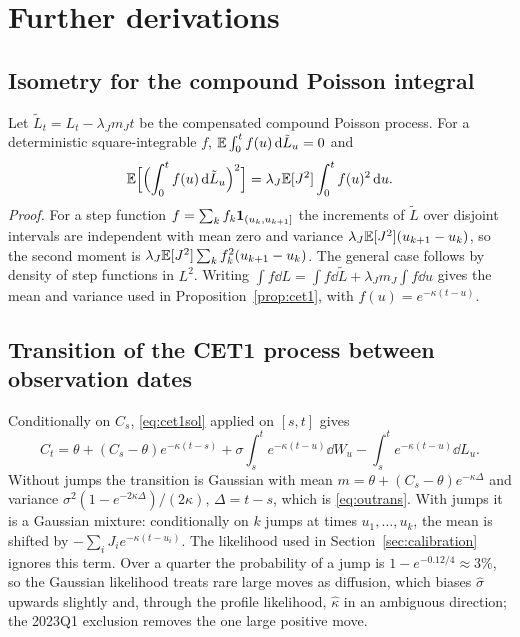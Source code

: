 \section{Further derivations}\label{app:derivations}

\subsection{Isometry for the compound Poisson integral}

Let $\tilde L_t=L_t-\lambda_Jm_Jt$ be the compensated compound Poisson process. For a
deterministic square-integrable $f$, $\mathbb{E}\int_0^tf(u)\,\mathrm{d}\tilde L_u=0$ and
\[
  \mathbb{E}\Bigl[\Bigl(\int_0^tf(u)\,\mathrm{d}\tilde L_u\Bigr)^2\Bigr]=\lambda_J\mathbb{E}[J^2]\int_0^tf(u)^2\,\mathrm{d} u .
\]
\emph{Proof.} For a step function $f=\sum_kf_k\mathbf{1}_{(u_k,u_{k+1}]}$ the increments of $\tilde L$
over disjoint intervals are independent with mean zero and variance
$\lambda_J\mathbb{E}[J^2](u_{k+1}-u_k)$, so the second moment is
$\lambda_J\mathbb{E}[J^2]\sum_kf_k^2(u_{k+1}-u_k)$. The general case follows by density of step
functions in $L^2$. Writing $\int f\dd L=\int f\dd\tilde L+\lambda_Jm_J\int f\dd u$ gives the mean
and variance used in Proposition~\ref{prop:cet1}, with $f(u)=e^{-\kappa(t-u)}$.

\subsection{Transition of the CET1 process between observation dates}

Conditionally on $C_s$, \eqref{eq:cet1sol} applied on $[s,t]$ gives
\[
  C_t=\theta+(C_s-\theta)e^{-\kappa(t-s)}+\sigma\int_s^te^{-\kappa(t-u)}\dd W_u-\int_s^te^{-\kappa(t-u)}\dd L_u .
\]
Without jumps the transition is Gaussian with mean $m=\theta+(C_s-\theta)e^{-\kappa\Delta}$ and
variance $\sigma^2(1-e^{-2\kappa\Delta})/(2\kappa)$, $\Delta=t-s$, which is \eqref{eq:outrans}.
With jumps it is a Gaussian mixture: conditionally on $k$ jumps at times
$u_1,\dots,u_k$, the mean is shifted by $-\sum_iJ_ie^{-\kappa(t-u_i)}$. The likelihood used in
Section~\ref{sec:calibration} ignores this term. Over a quarter the probability of a jump is
$1-e^{-0.12/4}\approx3\%$, so the Gaussian likelihood treats rare large moves as diffusion,
which biases $\hat\sigma$ upwards slightly and, through the profile likelihood, $\hat\kappa$ in
an ambiguous direction; the 2023Q1 exclusion removes the one large positive move.


